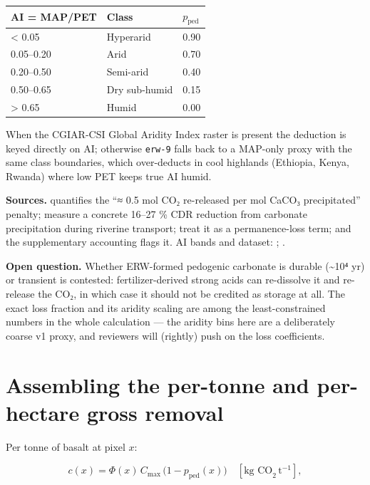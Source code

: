 \documentclass[openany]{book}
\newcounter{none} %
\begin{document}
{\def\LTcaptype{none} %
\begin{longtable}[]{@{}lll@{}}
\toprule\noalign{}
AI = MAP/PET & Class & \(p_{\text{ped}}\) \\
\midrule\noalign{}
\endhead
\bottomrule\noalign{}
\endlastfoot
\textless{} 0.05 & Hyperarid & 0.90 \\
0.05--0.20 & Arid & 0.70 \\
0.20--0.50 & Semi-arid & 0.40 \\
0.50--0.65 & Dry sub-humid & 0.15 \\
\textgreater{} 0.65 & Humid & 0.00 \\
\end{longtable}
}

When the CGIAR-CSI Global Aridity Index raster \citep{zomer2022} is present the
deduction is keyed directly on AI; otherwise \texttt{erw-9} falls back to a
MAP-only proxy with the same class boundaries, which over-deducts in cool
highlands (Ethiopia, Kenya, Rwanda) where low PET keeps true AI humid.

\textbf{Sources.} \citet{renforth2019} quantifies the ``≈ 0.5 mol CO₂
re-released per mol CaCO₃ precipitated'' penalty; \citet{harrington2023} measure
a concrete 16--27 \% CDR reduction from carbonate precipitation during riverine
transport; \citet{kanzaki2023} treat it as a permanence-loss term; and the
\citet{beerling2020} supplementary accounting flags it. AI bands and dataset:
\citet{unep1992}; \citet{zomer2022}.

\textbf{Open question.} Whether ERW-formed pedogenic carbonate is durable
(\textasciitilde10⁴ yr) or transient is contested: fertilizer-derived strong
acids can re-dissolve it and re-release the CO₂, in which case it should not be
credited as storage at all. The exact loss fraction and its aridity scaling are
among the least-constrained numbers in the whole calculation --- the aridity
bins here are a deliberately coarse v1 proxy, and reviewers will (rightly) push
on the loss coefficients.

\chapter{Assembling the per-tonne and per-hectare gross removal}\label{ch:assemble}

Per tonne of basalt at pixel \(x\):

\[
c(x) = \Phi(x)\, C_{\max}\,\big(1-p_{\text{ped}}(x)\big) \quad[\text{kg CO}_2\,\text{t}^{-1}],
\]
\end{document}
